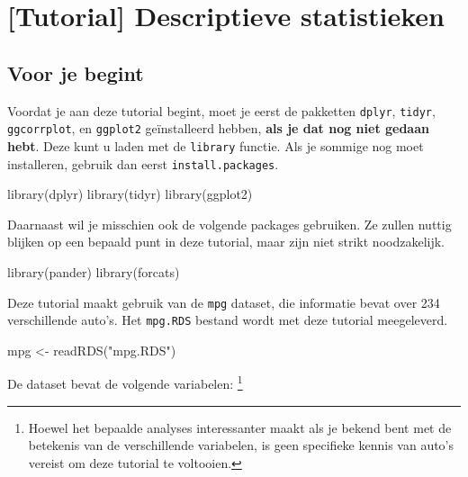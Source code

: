 \documentclass[]{tufte-book}
\newenvironment{Shaded}{}{}
\newcommand{\FunctionTok}[1]{\textcolor[rgb]{0.02,0.16,0.49}{#1}}
\newcommand{\NormalTok}[1]{#1}
\newcommand{\OtherTok}[1]{\textcolor[rgb]{0.00,0.44,0.13}{#1}}
\newcommand{\StringTok}[1]{\textcolor[rgb]{0.25,0.44,0.63}{#1}}
\begin{document}
\hypertarget{tutorial-descriptieve-statistieken}{%
\chapter{{[}Tutorial{]} Descriptieve statistieken}\label{tutorial-descriptieve-statistieken}}

\hypertarget{voor-je-begint-1}{%
\section{Voor je begint}\label{voor-je-begint-1}}

Voordat je aan deze tutorial begint, moet je eerst de pakketten \texttt{dplyr}, \texttt{tidyr}, \texttt{ggcorrplot}, en \texttt{ggplot2} geïnstalleerd hebben, \textbf{als je dat nog niet gedaan hebt}. Deze kunt u laden met de \texttt{library} functie. Als je sommige nog moet installeren, gebruik dan eerst \texttt{install.packages}.

\begin{Shaded}
\begin{Highlighting}[]
\FunctionTok{library}\NormalTok{(dplyr)}
\FunctionTok{library}\NormalTok{(tidyr)}
\FunctionTok{library}\NormalTok{(ggplot2)}
\end{Highlighting}
\end{Shaded}

Daarnaast wil je misschien ook de volgende packages gebruiken. Ze zullen nuttig blijken op een bepaald punt in deze tutorial, maar zijn niet strikt noodzakelijk.

\begin{Shaded}
\begin{Highlighting}[]
\FunctionTok{library}\NormalTok{(pander)}
\FunctionTok{library}\NormalTok{(forcats)}
\end{Highlighting}
\end{Shaded}

Deze tutorial maakt gebruik van de \texttt{mpg} dataset, die informatie bevat over 234 verschillende auto's. Het \texttt{mpg.RDS} bestand wordt met deze tutorial meegeleverd.

\begin{Shaded}
\begin{Highlighting}[]
\NormalTok{mpg }\OtherTok{\textless{}{-}} \FunctionTok{readRDS}\NormalTok{(}\StringTok{"mpg.RDS"}\NormalTok{)}
\end{Highlighting}
\end{Shaded}

De dataset bevat de volgende variabelen: \footnote{Hoewel het bepaalde analyses interessanter maakt als je bekend bent met de betekenis van de verschillende variabelen, is geen specifieke kennis van auto's vereist om deze tutorial te voltooien.}
\end{document}
